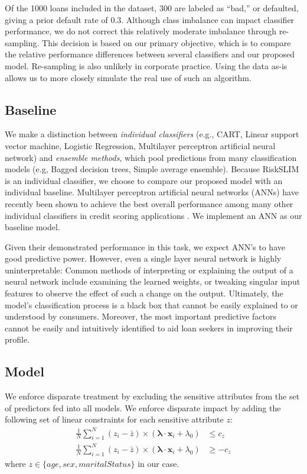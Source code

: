 \documentclass[11pt, margin=1in]{article}
\newcommand{\vect}[1]{\boldsymbol{#1}}
\begin{document}
Of the 1000 loans included in the dataset, 300 are labeled as ``bad,'' or defaulted, giving a prior default rate of 0.3. Although class imbalance can impact classifier performance, we do not correct this relatively moderate  imbalance through re-sampling. This decision is based on our primary objective, which is to compare the relative performance differences between several classifiers and our proposed model. Re-sampling is also unlikely in corporate practice. Using the data as-is allows us to more closely simulate the real use of such an algorithm. 

\subsection{Baseline} \label{ssec:baseline}

We make a distinction between \textit{individual classifiers } (e.g., CART, Linear support vector machine, Logistic Regression, Multilayer perceptron artificial neural network) and \textit{ensemble methods}, which pool predictions from many classification models (e.g, Bagged decision trees, Simple average ensemble). Because RiskSLIM is an individual classifier, we choose to compare our proposed model with an individual baseline. Multilayer perceptron artificial neural networks (ANNs) have recently been shown to achieve the best overall performance among many other individual classifiers in credit scoring applications \cite{benchmarks}. We implement an ANN as our baseline model.

Given their demonstrated performance in this task, we expect ANN's to have good predictive power. However, even a single layer neural network is highly uninterpretable: Common methods of interpreting or explaining the output of a neural network include examining the learned weights, or tweaking singular input features to observe the effect of such a change on the output. Ultimately, the model's classification process is a black box that cannot be easily explained to or understood by consumers. Moreover, the most important predictive factors cannot be easily and intuitively identified to aid loan seekers in improving their profile. 

\subsection{Model}

We enforce disparate treatment by excluding the sensitive attributes from the set of predictors fed into all models. We enforce disparate impact by adding the following set of linear constraints for each sensitive attribute $z$:
\begin{align*}
\frac{1}{N} \sum_{i=1}^N (z_i - \bar{z}) \times (\vect{\lambda} \cdot \vect{x}_i + \lambda_0) &\leq c_z\\
\frac{1}{N} \sum_{i=1}^N (z_i - \bar{z}) \times (\vect{\lambda} \cdot \vect{x}_i + \lambda_0) &\geq -c_z 
\end{align*}
where $z \in \{age, sex, maritalStatus\}$ in our case.
\end{document}
